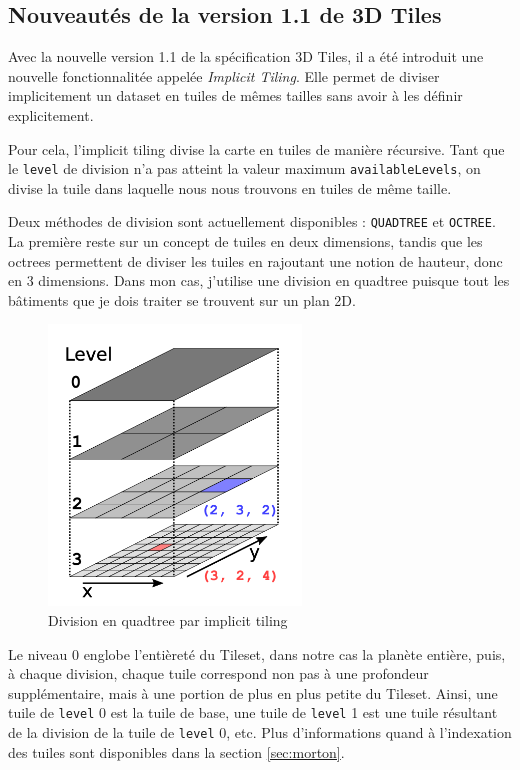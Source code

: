 \subsection{Nouveautés de la version 1.1 de 3D Tiles}

Avec la nouvelle version 1.1 de la spécification 3D Tiles, il a été introduit une nouvelle fonctionnalitée appelée \textit{Implicit Tiling}. Elle permet de diviser implicitement un dataset en tuiles de mêmes tailles sans avoir à les définir explicitement.

Pour cela, l'implicit tiling divise la carte en tuiles de manière récursive. Tant que le \texttt{level} de division n'a pas atteint la valeur maximum \texttt{availableLevels}, on divise la tuile dans laquelle nous nous trouvons en tuiles de même taille.

Deux méthodes de division sont actuellement disponibles : \texttt{QUADTREE} et \texttt{OCTREE}. La première reste sur un concept de tuiles en deux dimensions, tandis que les octrees permettent de diviser les tuiles en rajoutant une notion de hauteur, donc en 3 dimensions. Dans mon cas, j'utilise une division en quadtree puisque tout les bâtiments que je dois traiter se trouvent sur un plan 2D.

\begin{figure}[H]
    \centering
    \includegraphics[width=0.6\textwidth]{assets/figures/implicit-tiling-small.png}
    \caption{Division en quadtree par implicit tiling \cite{3d-tiles-specification}}
    \label{fig:implicit-tiling}
\end{figure}

Le niveau 0 englobe l'entièreté du Tileset, dans notre cas la planète entière, puis, à chaque division, chaque tuile correspond non pas à une profondeur supplémentaire, mais à une portion de plus en plus petite du Tileset. Ainsi, une tuile de \texttt{level} 0 est la tuile de base, une tuile de \texttt{level} 1 est une tuile résultant de la division de la tuile de \texttt{level} 0, etc. Plus d'informations quand à l'indexation des tuiles sont disponibles dans la section \ref{sec:morton}.

